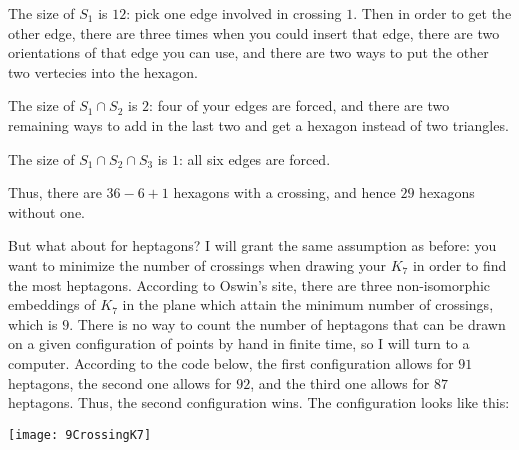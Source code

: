 \documentclass[11pt]{article}
\theoremstyle{definition}
\begin{document}
The size of $S_1$ is $12$: pick one edge involved in crossing $1$.  Then in order to get the other edge, there are three times when you could insert that edge, there are two orientations of that edge you can use, and there are two ways to put the other two vertecies into the hexagon.

The size of $S_1 \cap S_2$ is $2$: four of your edges are forced, and there are two remaining ways to add in the last two and get a hexagon instead of two triangles.

The size of $S_1 \cap S_2 \cap S_3$ is $1$: all six edges are forced.

Thus, there are $36-6+1$ hexagons with a crossing, and hence $29$ hexagons without one.

But what about for heptagons?  I will grant the same assumption as before: you want to minimize the number of crossings when drawing your $K_7$ in order to find the most heptagons.  According to Oswin's site, there are three non-isomorphic embeddings of $K_7$ in the plane which attain the minimum number of crossings, which is $9$.  There is no way to count the number of heptagons that can be drawn on a given configuration of points by hand in finite time, so I will turn to a computer.  According to the code below, the first configuration allows for $91$ heptagons, the second one allows for $92$, and the third one allows for $87$ heptagons.  Thus, the second configuration wins.  The configuration looks like this:

\texttt{[image: 9CrossingK7]}
\end{document}
